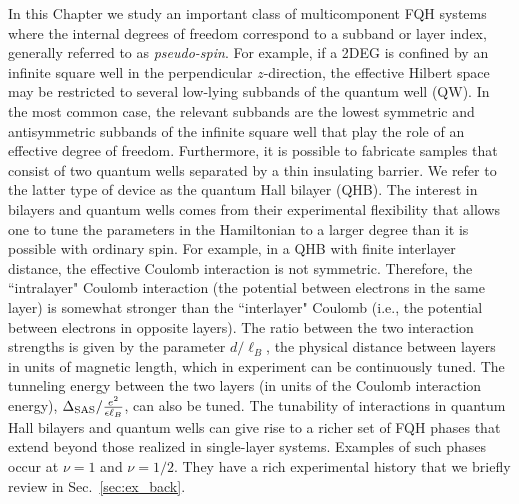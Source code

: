 In this Chapter we study an important class of multicomponent FQH systems where the internal degrees of freedom correspond to a subband or layer index, generally referred to as \emph{pseudo-spin}. 
For example, if a 2DEG is confined by an infinite square well in the perpendicular $z$-direction, the effective Hilbert space may be restricted to several low-lying subbands of the quantum well (QW). 
In the most common case, the relevant subbands are the lowest symmetric and antisymmetric subbands of the infinite square well that play the role of an effective  degree of freedom. 
Furthermore, it is possible to fabricate samples that consist of two quantum wells separated by a thin insulating barrier. We refer to the latter type of device as the quantum Hall bilayer (QHB). 
The interest in bilayers and quantum wells comes from their experimental flexibility that allows one to tune the parameters in the Hamiltonian to a larger degree than it is possible with ordinary spin. For example, in a QHB with finite interlayer distance, the effective Coulomb interaction is not  symmetric. Therefore, the ``intralayer" Coulomb interaction (the potential between electrons in the same layer) is somewhat stronger than the ``interlayer" Coulomb (i.e., the potential between electrons in opposite layers).
The ratio between the two interaction strengths is given by the parameter $d/\ell_B$, the physical distance between layers in units of magnetic length, which in experiment can be continuously tuned.
The tunneling energy between the two layers (in units of the Coulomb interaction energy), $\Delta_\textrm{SAS}/\frac{e^2}{\epsilon\ell_B}$, can also be tuned.
The tunability of interactions in quantum Hall bilayers and quantum wells can give rise to a richer set of FQH phases that extend beyond those realized in single-layer systems.
Examples of such phases occur at $\nu=1$ and $\nu=1/2$.
They have a rich experimental history that we briefly review in Sec.~\ref{sec:ex_back}. 


